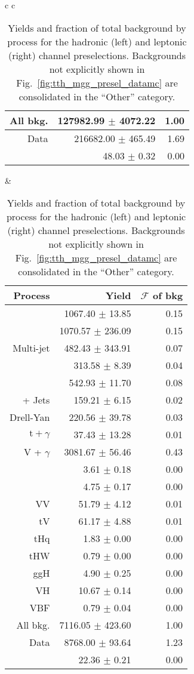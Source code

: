 \begin{table} [h!]
\begin{tabular}{c c}
\begin{tabular}{ r || r | r}
			All bkg. & 127982.99 $\pm$ 4072.22 & 1.00 \\ \hline
			Data & 216682.00 $\pm$ 465.49 & 1.69 \\ \hline
			\ttH & 48.03 $\pm$ 0.32 & 0.00 \\  \hline \hline
		\end{tabular}    
		&
		\begin{tabular}{ r || r | r} \hline \hline
			Process & Yield & $\mathcal F$ of bkg \\ \hline
            \dipho & 1067.40 $\pm$ 13.85 & 0.15 \\ 
			\gjets & 1070.57 $\pm$ 236.09 & 0.15 \\ 
			Multi-jet & 482.43 $\pm$ 343.91 & 0.07 \\ 
			\ttgg & 313.58 $\pm$ 8.39 & 0.04 \\ 
			\ttg & 542.93 $\pm$ 11.70 & 0.08 \\ 
			\ttb + Jets & 159.21 $\pm$ 6.15 & 0.02 \\ 
			Drell-Yan & 220.56 $\pm$ 39.78 & 0.03 \\ 
            $\text{t} + \gamma$ & 37.43 $\pm$ 13.28 & 0.01 \\ 
			V + $\gamma$ & 3081.67 $\pm$ 56.46 & 0.43 \\ 
			\ttW & 3.61 $\pm$ 0.18 & 0.00 \\ 
			\ttZ & 4.75 $\pm$ 0.17 & 0.00 \\ 
			VV & 51.79 $\pm$ 4.12 & 0.01 \\ 
			tV & 61.17 $\pm$ 4.88 & 0.01 \\  \hline
			tHq & 1.83 $\pm$ 0.00 & 0.00 \\ 
            tHW & 0.79 $\pm$ 0.00 & 0.00 \\ 
			ggH & 4.90 $\pm$ 0.25 & 0.00 \\ 
            VH & 10.67 $\pm$ 0.14 & 0.00 \\ 
            VBF & 0.79 $\pm$ 0.04 & 0.00 \\ \hline 
			All bkg. & 7116.05 $\pm$ 423.60 & 1.00 \\ \hline
			Data & 8768.00 $\pm$ 93.64 & 1.23 \\ \hline
			\ttH & 22.36 $\pm$ 0.21 & 0.00 \\  \hline \hline
		\end{tabular}
    \end{tabular}
    \caption{Yields and fraction of total background by process for the hadronic (left) and leptonic (right) channel preselections. Backgrounds not explicitly shown in Fig.~\ref{fig:tth_mgg_presel_datamc} are consolidated in the ``Other'' category.}
	\label{tab:tth_presel_datamc}
\end{table}

